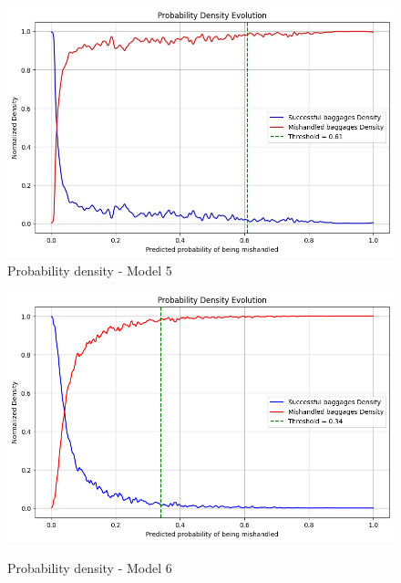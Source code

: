 \documentclass[12pt]{article}
\begin{document}
\begin{figure}
\begin{minipage}[c]{0.5\linewidth}
    \includegraphics[width=1\textwidth]{Probability_density_Model 5.jpg}\\
    \caption{Probability density - Model 5}
\end{minipage}
\hfill
\begin{minipage}[c]{0.5\linewidth}
    \includegraphics[width=1\textwidth]{Probability_density_Model 6.png}\\
    \caption{Probability density - Model 6}
\end{minipage}%
\end{figure}
\end{document}
